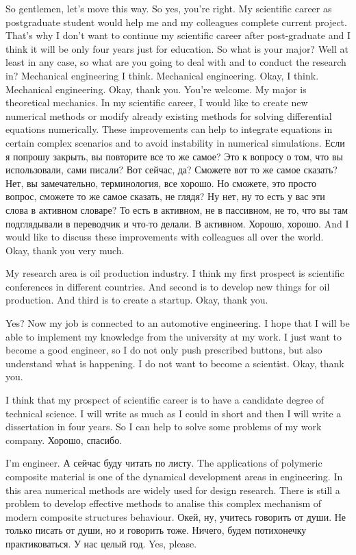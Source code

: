 \documentclass[main.tex]{subfiles}
\begin{document}
So gentlemen, let's move this way.
So yes, you're right.
My scientific career as postgraduate student would help me and my colleagues complete current project.
That's why I don't want to continue my scientific career after post-graduate and I think it will be only four years just for education.
So what is your major?
Well at least in any case, so what are you going to deal with and to conduct the research in? Mechanical engineering I think.
Mechanical engineering.
Okay, I think.
Mechanical engineering.
Okay, thank you.
You're welcome.
My major is theoretical mechanics.
In my scientific career, I would like to create new numerical methods or modify already existing methods for solving differential equations numerically.
These improvements can help to integrate equations in certain complex scenarios and to avoid instability in numerical simulations.
Если я попрошу закрыть, вы повторите все то же самое?
Это к вопросу о том, что вы использовали, сами писали?
Вот сейчас, да? Сможете вот то же самое сказать? Нет, вы замечательно, терминология, все хорошо.
Но сможете, это просто вопрос, сможете то же самое сказать, не глядя?
Ну нет, ну то есть у вас эти слова в активном словаре?
То есть в активном, не в пассивном, не то, что вы там подглядывали в переводчик и что-то делали.
В активном.
Хорошо, хорошо.
And I would like to discuss these improvements with colleagues all over the world.
Okay, thank you very much.

My research area is oil production industry.
I think my first prospect is scientific conferences in different countries.
And second is to develop new things for oil production.
And third is to create a startup.
Okay, thank you.

Yes? Now my job is connected to an automotive engineering.
I hope that I will be able to implement my knowledge from the university at my work.
I just want to become a good engineer, so I do not only push prescribed buttons, but also understand what is happening.
I do not want to become a scientist.
Okay, thank you.

I think that my prospect of scientific career is to have a candidate degree of technical science.
I will write as much as I could in short and then I will write a dissertation in four years.
So I can help to solve some problems of my work company.
Хорошо, спасибо.

I'm engineer.
А сейчас буду читать по листу.
The applications of polymeric composite material is one of the dynamical development areas in engineering.
In this area numerical methods are widely used for design research.
There is still a problem to develop effective methods to analise this complex mechanism of modern composite structures behaviour.
Окей, ну, учитесь говорить от души.
Не только писать от души, но и говорить тоже.
Ничего, будем потихонечку практиковаться.
У нас целый год.
Yes, please.
\end{document}
